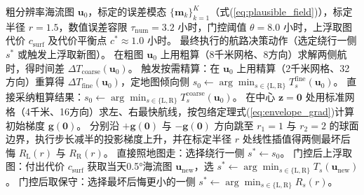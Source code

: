 \begin{algorithm}[htbp]
\caption{基于合理反例检验的自主水下航行器航路门控决策算法}
\label{alg:counterexample_gate}
\begin{algorithmic}[1]
\Require 粗分辨率海流图 $\boldsymbol{u}_0$，标定的误差模态 $\{\boldsymbol{m}_k\}_{k=1}^{K}$（式(\ref{eq:plausible_field})），标定半径 $r=1.5$，数值误差容限 $\tau_{\text{num}}=3.2$ 小时，门控阈值 $\theta=8.0$ 小时，上浮取图代价 $c_{\text{surf}}$ 及代价平衡点 $c^* \approx 1.0$ 小时。
\Ensure 最终执行的航路决策动作（选定绕行一侧 $s^*$ 或触发上浮取新图）。
\State 在粗图 $\boldsymbol{u}_0$ 上用粗算（8千米网格、8方向）求解两侧航时，得时间差 $\Delta T_{\text{coarse}}(\boldsymbol{u}_0)$。
    \State 触发按需精算：在 $\boldsymbol{u}_0$ 上用精算（2千米网格、32方向）重算得 $\Delta T_{\text{fine}}(\boldsymbol{u}_0)$，定地图倾向侧 $s_0 \gets \arg\min_{s \in \{\text{L},\text{R}\}} T_s^{\text{fine}}(\boldsymbol{u}_0)$。
\Else
    \State 直接采纳粗算结果：$s_0 \gets \arg\min_{s \in \{\text{L},\text{R}\}} T_s^{\text{coarse}}(\boldsymbol{u}_0)$。
\EndIf
\State 在中心 $\boldsymbol{z}=\boldsymbol{0}$ 处用标准网格（4千米、16方向）求左、右最快航线，按包络定理式(\ref{eq:envelope_grad})计算初始梯度 $\boldsymbol{g}(\boldsymbol{0})$。
\State 分别沿 $+\boldsymbol{g}(\boldsymbol{0})$ 与 $-\boldsymbol{g}(\boldsymbol{0})$ 方向跳至 $r_1=1$ 与 $r_2=2$ 的球面边界，执行步长减半的投影梯度上升，并在标定半径 $r$ 处线性插值得两侧最坏后悔 $R_{\text{L}}(r)$ 与 $R_{\text{R}}(r)$。
    \State \Return 直接照地图走：选择绕行一侧 $s^* \gets s_0$。
\Else
        \State \Return 门控后上浮取图：付出代价 $c_{\text{surf}}$ 获取当天0.5°海流图 $\boldsymbol{u}_{\text{new}}$，选 $s^* \gets \arg\min_{s \in \{\text{L},\text{R}\}} T_s(\boldsymbol{u}_{\text{new}})$。
    \Else
        \State \Return 门控后取保守：选择最坏后悔更小的一侧 $s^* \gets \arg\min_{s \in \{\text{L},\text{R}\}} R_s(r)$。
    \EndIf
\EndIf
\end{algorithmic}
\end{algorithm}
